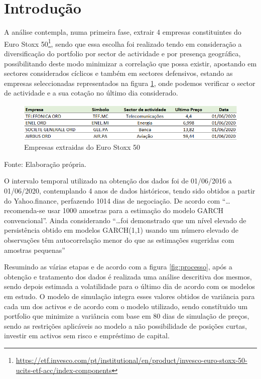 \documentclass[
  12pt,
  a4paper,
  openany]{book}
\begin{document}
\newpage

\hypertarget{introduuxe7uxe3o-1}{%
\section{Introdução}\label{introduuxe7uxe3o-1}}

A análise contempla, numa primeira fase, extrair 4 empresas constituintes do Euro Stoxx 50\footnote{\url{https://etf.invesco.com/pt/institutional/en/product/invesco-euro-stoxx-50-ucits-etf-acc/index-components}}, sendo que essa escolha foi realizado tendo em consideração a diversificação do portfolio por sector de actividade e por presença geográfica, possibilitando deste modo minimizar a correlação que possa existir, apostando em sectores considerados cíclicos e também em sectores defensivos, estando as empresas seleccionadas representados na figura \ref{fig:empresas}, onde podemos verificar o sector de actividade e a sua cotação no último dia considerado.

\begin{figure}

{\centering \includegraphics[width=1\linewidth]{image/cotacao} 

}

\caption{Empresas extraidas do Euro Stoxx 50}\label{fig:empresas}
\end{figure}
\FloatBarrier
\centering

Fonte: Elaboração própria.

\justifying
\bigskip

O intervalo temporal utilizado na obtenção dos dados foi de 01/06/2016 a 01/06/2020, contemplando 4
anos de dados históricos, tendo sido obtidos a partir do Yahoo.finance, perfazendo 1014 dias de negociação. De acordo com \citet{NG2006} ``\ldots recomenda-se usar 1000 amostras para a estimação do modelo GARCH convencional''. Ainda considerando \citet{smallsample} ``\ldots foi demonstrado que um nível elevado de persistência obtido em modelos GARCH(1,1) usando um número elevado de observações têm autocorrelação menor do que as estimações sugeridas com amostras pequenas''

Resumindo as várias etapas e de acordo com a figura \ref{fig:processo}, após a obtenção e tratamento dos dados é realizada uma análise descritiva dos mesmos, sendo depois estimada a volatilidade para o último dia de acordo com os modelos em estudo. O modelo de simulação integra esses valores obtidos de variância para cada um dos activos e de acordo com o modelo utilizado, sendo constítuido um portfolio que minimize a variância com base em 80 dias de simulação de preços, sendo as restrições aplicáveis ao modelo a não possibilidade de posições curtas, investir em activos sem risco e empréstimo de capital.
\end{document}
